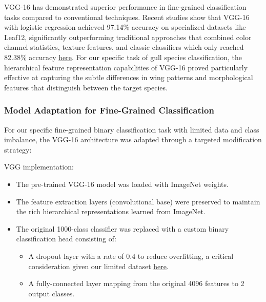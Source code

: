 \documentclass[a4paper,12pt]{article}
\begin{document}
VGG-16 has demonstrated superior performance in fine-grained classification tasks compared to conventional techniques. Recent studies show that VGG-16 with logistic regression achieved 97.14\% accuracy on specialized datasets like Leaf12, significantly outperforming traditional approaches that combined color channel statistics, texture features, and classic classifiers which only reached 82.38\% accuracy \href{https://doi.org/10.3233/JIFS-169911}{here}. For our specific task of gull species classification, the hierarchical feature representation capabilities of VGG-16 proved particularly effective at capturing the subtle differences in wing patterns and morphological features that distinguish between the target species.

\subsubsection{Model Adaptation for Fine-Grained Classification}
For our specific fine-grained binary classification task with limited data and class imbalance, the VGG-16 architecture was adapted through a targeted modification strategy:



VGG implementation:

\begin{itemize}
    \item The pre-trained VGG-16 model was loaded with ImageNet weights.
    \item The feature extraction layers (convolutional base) were preserved to maintain the rich hierarchical representations learned from ImageNet.
    \item The original 1000-class classifier was replaced with a custom binary classification head consisting of: 
    \begin{itemize}
        \item A dropout layer with a rate of 0.4 to reduce overfitting, a critical consideration given our limited dataset \href{https://www.jmlr.org/papers/volume15/srivastava14a/srivastava14a.pdf}{here}.
        \item A fully-connected layer mapping from the original 4096 features to 2 output classes.
    \end{itemize}
\end{itemize}
\end{document}
